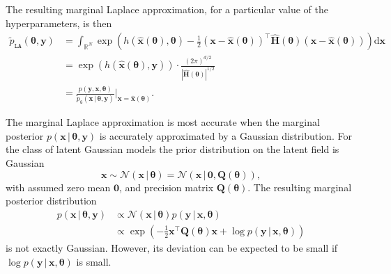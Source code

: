 \documentclass[a4paper, nobind]{templates/ociamthesis}
\begin{document}
The resulting marginal Laplace approximation, for a particular value of the hyperparameters, is then
\begin{align}
\tilde p_{\texttt{LA}}(\boldsymbol{\mathbf{\theta}}, \mathbf{y}) &= \int_{\mathbb{R}^N} \exp \left( h(\hat{\mathbf{x}}(\boldsymbol{\mathbf{\theta}}), \boldsymbol{\mathbf{\theta}}) - \frac{1}{2} (\mathbf{x} - \hat{\mathbf{x}}(\boldsymbol{\mathbf{\theta}}))^\top \hat {\mathbf{H}}(\boldsymbol{\mathbf{\theta}}) (\mathbf{x} - \hat{\mathbf{x}}(\boldsymbol{\mathbf{\theta}})) \right) \text{d}\mathbf{x} \label{eq:marginalla} \\
&= \exp(h(\hat{\mathbf{x}}(\boldsymbol{\mathbf{\theta}}), \mathbf{y})) \cdot \frac{(2 \pi)^{d/2}}{| \hat {\mathbf{H}}(\boldsymbol{\mathbf{\theta}}) |^{1/2}} \\
&= \frac{p(\mathbf{y}, \mathbf{x}, \boldsymbol{\mathbf{\theta}})}{\tilde p_\texttt{G}(\mathbf{x} \, | \, \boldsymbol{\mathbf{\theta}}, \mathbf{y})} \Big\rvert_{\mathbf{x} = \hat{\mathbf{x}}(\boldsymbol{\mathbf{\theta}})}.
\end{align}

The marginal Laplace approximation is most accurate when the marginal posterior \(p(\mathbf{x} \, | \, \boldsymbol{\mathbf{\theta}}, \mathbf{y})\) is accurately approximated by a Gaussian
distribution.
For the class of latent Gaussian models \autocite{rue2009approximate} the prior distribution on the latent field is Gaussian
\begin{equation}
\mathbf{x} \sim \mathcal{N}(\mathbf{x} \, | \, \boldsymbol{\mathbf{\theta}}) = \mathcal{N}(\mathbf{x} \, | \, \mathbf{0}, \mathbf{Q}(\boldsymbol{\mathbf{\theta}})),
\end{equation}
with assumed zero mean \(\mathbf{0}\), and precision matrix \(\mathbf{Q}(\boldsymbol{\mathbf{\theta}})\).
The resulting marginal posterior distribution
\begin{align}
p(\mathbf{x} \, | \, \boldsymbol{\mathbf{\theta}}, \mathbf{y}) &\propto \mathcal{N}(\mathbf{x} \, | \, \boldsymbol{\mathbf{\theta}}) p(\mathbf{y}  \, | \, \mathbf{x}, \boldsymbol{\mathbf{\theta}}) \\
&\propto \exp \left( - \frac{1}{2} \mathbf{x}^\top \mathbf{Q}(\boldsymbol{\mathbf{\theta}}) \mathbf{x} + \log p(\mathbf{y} \, | \, \mathbf{x}, \boldsymbol{\mathbf{\theta}}) \right)
\end{align}
is not exactly Gaussian.
However, its deviation can be expected to be small if \(\log p(\mathbf{y} \, | \, \mathbf{x}, \boldsymbol{\mathbf{\theta}})\) is small.
\end{document}
